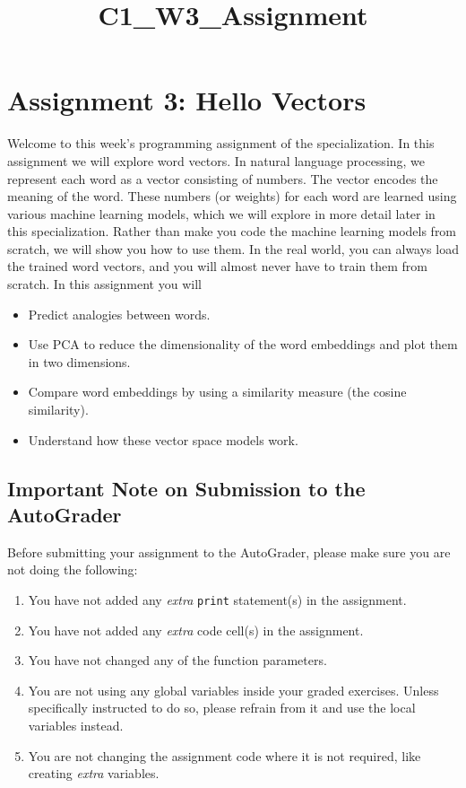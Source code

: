 \documentclass[11pt]{article}
\title{C1\_W3\_Assignment}
\providecommand{\tightlist}{%
      \setlength{\itemsep}{0pt}\setlength{\parskip}{0pt}}
\begin{document}
    
    \maketitle
    
    

    
    \hypertarget{assignment-3-hello-vectors}{%
\section{Assignment 3: Hello Vectors}\label{assignment-3-hello-vectors}}

Welcome to this week's programming assignment of the specialization. In
this assignment we will explore word vectors. In natural language
processing, we represent each word as a vector consisting of numbers.
The vector encodes the meaning of the word. These numbers (or weights)
for each word are learned using various machine learning models, which
we will explore in more detail later in this specialization. Rather than
make you code the machine learning models from scratch, we will show you
how to use them. In the real world, you can always load the trained word
vectors, and you will almost never have to train them from scratch. In
this assignment you will

\begin{itemize}
\tightlist
\item
  Predict analogies between words.
\item
  Use PCA to reduce the dimensionality of the word embeddings and plot
  them in two dimensions.
\item
  Compare word embeddings by using a similarity measure (the cosine
  similarity).
\item
  Understand how these vector space models work.
\end{itemize}

    \hypertarget{important-note-on-submission-to-the-autograder}{%
\subsection{Important Note on Submission to the
AutoGrader}\label{important-note-on-submission-to-the-autograder}}

Before submitting your assignment to the AutoGrader, please make sure
you are not doing the following:

\begin{enumerate}
\def\labelenumi{\arabic{enumi}.}
\tightlist
\item
  You have not added any \emph{extra} \texttt{print} statement(s) in the
  assignment.
\item
  You have not added any \emph{extra} code cell(s) in the assignment.
\item
  You have not changed any of the function parameters.
\item
  You are not using any global variables inside your graded exercises.
  Unless specifically instructed to do so, please refrain from it and
  use the local variables instead.
\item
  You are not changing the assignment code where it is not required,
  like creating \emph{extra} variables.
\end{enumerate}
\end{document}

